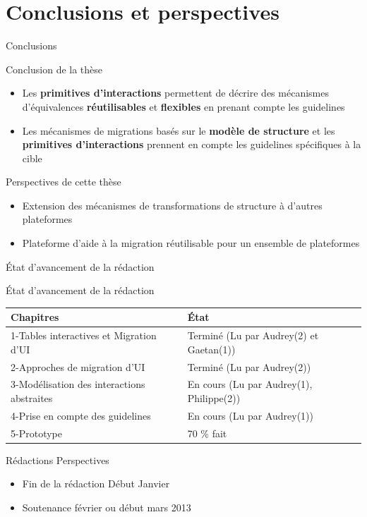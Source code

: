 \documentclass[11pt]{beamer}
\begin{document}
\section[Conclusions]{Conclusions et perspectives}

\begin{frame}{Conclusions }
\begin{block}{{\small Conclusion de la thèse}}
\begin{itemize}
\item {\scriptsize Les \textbf{primitives d'interactions} permettent de décrire des mécanismes d'équivalences \textbf{réutilisables} et \textbf{flexibles} en prenant compte les guidelines}
\item {\scriptsize Les mécanismes de migrations basés sur le \textbf{modèle de structure} et les \textbf{primitives d'interactions} prennent en compte les guidelines spécifiques à la cible }
\end{itemize}
\end{block}
\pause
\begin{block}{Perspectives de cette thèse}
\begin{itemize}
\item {\scriptsize Extension des mécanismes de transformations de structure à d'autres plateformes }
\item {\scriptsize Plateforme d'aide à la migration réutilisable pour un ensemble de plateformes}
\end{itemize}
\end{block}
\end{frame}
\begin{frame}{État d'avancement de la rédaction}

\begin{block}{{\scriptsize État d'avancement de la rédaction}}
\begin{tabular}{|l|l|} 	
\hline {\tiny \textbf{Chapitres}}  &  {\tiny \textbf{État}} \\ 
\hline {\tiny 1-Tables interactives et Migration d'UI} 
					& {\tiny Terminé (Lu par Audrey(2) et Gaetan(1))} \\ 
\hline {\tiny 2-Approches de migration d'UI} 
					& {\tiny Terminé (Lu par Audrey(2))} \\ 
\hline {\tiny 3-Modélisation des interactions abstraites} 
					& {\tiny En cours (Lu par Audrey(1), Philippe(2))}  \\ 
\hline {\tiny 4-Prise en compte des guidelines} 
					&  {\tiny En cours (Lu par Audrey(1))}\\ 
\hline {\tiny 5-Prototype} 
					& {\tiny 70 \% fait} \\ 
\hline 
\end{tabular} 
\end{block}

\pause
\begin{block}{Rédactions Perspectives}
	\begin{itemize}
		\item Fin de la rédaction Début Janvier 
		\item Soutenance février ou début mars 2013
	\end{itemize}
\end{block}
\end{frame}
\end{document}

